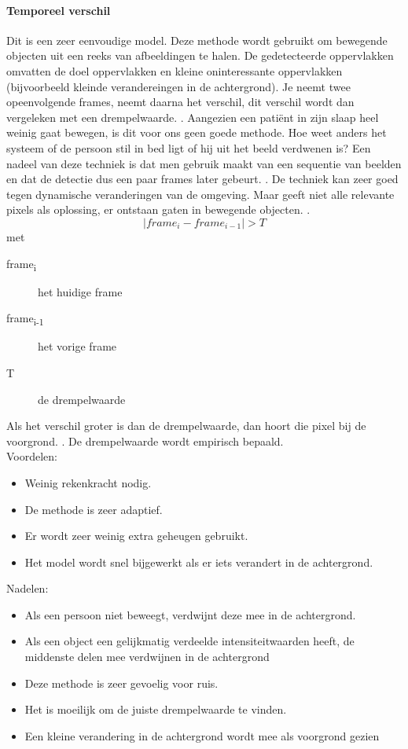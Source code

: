 \paragraph{Temporeel verschil}
\label{refFRD}
Dit is een zeer eenvoudige model. Deze methode wordt gebruikt om bewegende objecten uit een reeks van afbeeldingen te halen. De gedetecteerde oppervlakken omvatten de doel oppervlakken en kleine oninteressante oppervlakken (bijvoorbeeld kleinde verandereingen in de achtergrond)\cite{bibTeV}. Je neemt twee opeenvolgende frames, neemt daarna het verschil, dit verschil wordt dan vergeleken met een drempelwaarde. \cite{bibIPC2}. Aangezien een pati\"ent in zijn slaap heel weinig gaat bewegen, is dit voor ons geen goede methode. Hoe weet anders het systeem of de persoon stil in bed ligt of hij uit het beeld verdwenen is? Een nadeel van deze techniek is dat men gebruik maakt van een sequentie van beelden en dat de detectie dus een paar frames later gebeurt. \cite{bibIRC}. De techniek kan zeer goed tegen dynamische veranderingen van de omgeving. Maar geeft niet alle relevante pixels als oplossing, er ontstaan gaten in bewegende objecten. \cite{bibTVD}.
\begin{displaymath}
|frame_{i}-frame_{i-1}|>T
\end{displaymath}
met
\begin{description}
	\item [frame\textsubscript{i}] het huidige frame
	\item [frame\textsubscript{i-1}] het vorige frame
	\item [T] de drempelwaarde
\end{description}
Als het verschil groter is dan de drempelwaarde, dan hoort die pixel bij de voorgrond. \cite{bibBET3}. De drempelwaarde wordt empirisch bepaald.\\
Voordelen:
\begin{itemize}
	\item Weinig rekenkracht nodig.
	\item De methode is zeer adaptief.
	\item Er wordt zeer weinig extra geheugen gebruikt.
	\item Het model wordt snel bijgewerkt als er iets verandert in de achtergrond.
\end{itemize}
Nadelen:
\begin{itemize}
	\item Als een persoon niet beweegt, verdwijnt deze mee in de achtergrond.
	\item Als een object een gelijkmatig verdeelde intensiteitwaarden heeft, de middenste delen mee verdwijnen in de achtergrond
	\item Deze methode is zeer gevoelig voor ruis.
	\item Het is moeilijk om de juiste drempelwaarde te vinden.
	\item Een kleine verandering in de achtergrond wordt mee als voorgrond gezien 
\end{itemize}
\cite{bibTeV}

